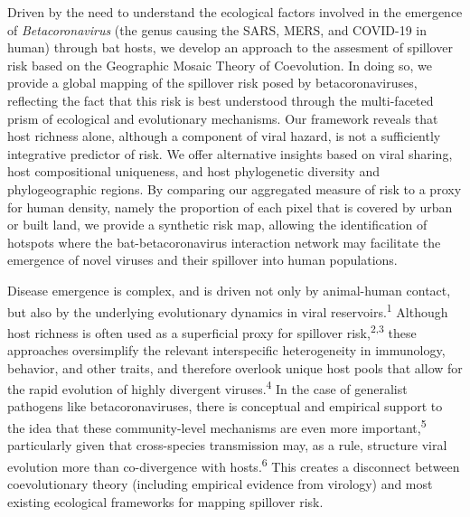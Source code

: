 \documentclass[11pt]{article}
\begin{document}
\vfill
Driven by the need to understand the ecological factors involved in the
emergence of \emph{Betacoronavirus} (the genus causing the SARS, MERS,
and COVID-19 in human) through bat hosts, we develop an approach to the
assesment of spillover risk based on the Geographic Mosaic Theory of
Coevolution. In doing so, we provide a global mapping of the spillover
risk posed by betacoronaviruses, reflecting the fact that this risk is
best understood through the multi-faceted prism of ecological and
evolutionary mechanisms. Our framework reveals that host richness alone,
although a component of viral hazard, is not a sufficiently integrative
predictor of risk. We offer alternative insights based on viral sharing,
host compositional uniqueness, and host phylogenetic diversity and
phylogeographic regions. By comparing our aggregated measure of risk to
a proxy for human density, namely the proportion of each pixel that is
covered by urban or built land, we provide a synthetic risk map,
allowing the identification of hotspots where the bat-betacoronavirus
interaction network may facilitate the emergence of novel viruses and
their spillover into human populations.



\vfill

\clearpage
\linenumbers
\pagestyle{normal}

Disease emergence is complex, and is driven not only by animal-human
contact, but also by the underlying evolutionary dynamics in viral
reservoirs.\textsuperscript{1} Although host richness is often used as a
superficial proxy for spillover risk,\textsuperscript{2,3} these
approaches oversimplify the relevant interspecific heterogeneity in
immunology, behavior, and other traits, and therefore overlook unique
host pools that allow for the rapid evolution of highly divergent
viruses.\textsuperscript{4} In the case of generalist pathogens like
betacoronaviruses, there is conceptual and empirical support to the idea
that these community-level mechanisms are even more
important,\textsuperscript{5} particularly given that cross-species
transmission may, as a rule, structure viral evolution more than
co-divergence with hosts.\textsuperscript{6} This creates a disconnect
between coevolutionary theory (including empirical evidence from
virology) and most existing ecological frameworks for mapping spillover
risk.
\end{document}
